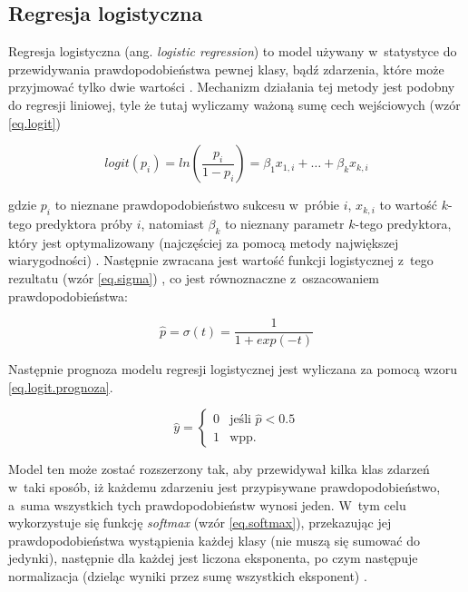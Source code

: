 
\subsection{Regresja logistyczna}
\label{Regresja logistyczna}

Regresja logistyczna (ang. \textit{logistic regression}) to model używany w~statystyce do przewidywania prawdopodobieństwa pewnej klasy, bądź zdarzenia, które może przyjmować tylko dwie wartości \cite{wiki:logit}. Mechanizm działania tej metody jest podobny do regresji liniowej, tyle że tutaj wyliczamy ważoną sumę cech wejściowych (wzór \ref{eq.logit})

\begin{equation}
\label{eq.logit}
logit(p_{i}) = ln( \frac {p_{i}} {1-p_{i}}) = \beta_{1}x_{1, i}+\dots+\beta_{k}x_{k, i}
\end{equation}

\noindent gdzie $p_i$ to nieznane prawdopodobieństwo sukcesu w~próbie $i$, $x_{k,i}$ to wartość $k$-tego predyktora próby $i$, natomiast $\beta_k$ to nieznany parametr $k$-tego predyktora, który jest optymalizowany (najczęściej za pomocą metody największej wiarygodności) \cite{Menard02}. Następnie zwracana jest wartość funkcji logistycznej z~tego rezultatu (wzór \ref{eq.sigma}) \cite{Sawka18}, co jest równoznaczne z~oszacowaniem prawdopodobieństwa: 

\begin{equation}
\label{eq.sigma}
	\hat p = \sigma(t)=\frac {1} {1+exp(-t)}
\end{equation}

\noindent Następnie prognoza modelu regresji logistycznej jest wyliczana za pomocą wzoru \ref{eq.logit.prognoza}.

\begin{equation}
\label{eq.logit.prognoza}
\hat {y} =
	\begin{cases}
	      0 & \text{jeśli $\hat {p} < 0.5$}\\
	      1 & \text{wpp.}
	\end{cases}       
\end{equation}

\noindent Model ten może zostać rozszerzony tak, aby przewidywał kilka klas zdarzeń w~taki sposób, iż każdemu zdarzeniu jest przypisywane prawdopodobieństwo, a~suma wszystkich tych prawdopodobieństw wynosi jeden. W~tym celu wykorzystuje się funkcję \textit{softmax} (wzór \ref{eq.softmax}), przekazując jej prawdopodobieństwa wystąpienia każdej klasy (nie muszą się sumować do jedynki), następnie dla każdej jest liczona eksponenta, po czym następuje normalizacja (dzieląc wyniki przez sumę wszystkich eksponent) \cite{Sawka18}.

